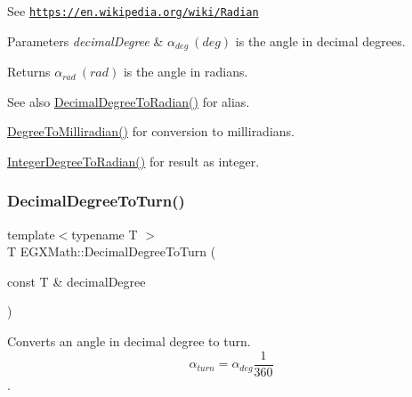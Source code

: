See \href{https://en.wikipedia.org/wiki/Radian}{\tt https\+://en.\+wikipedia.\+org/wiki/\+Radian} 
\begin{DoxyParams}{Parameters}
{\em decimal\+Degree} & $\alpha_{deg}\ (deg)$ is the angle in decimal degrees. \\
\hline
\end{DoxyParams}
\begin{DoxyReturn}{Returns}
$\alpha_{rad}\ (rad)$ is the angle in radians. 
\end{DoxyReturn}
\begin{DoxySeeAlso}{See also}
\mbox{\hyperlink{group___e_g_x_math-_angle_conversions-_decimal_degree_ga906ee2c83cdf4caa59eb613dc2d5d52a}{Decimal\+Degree\+To\+Radian()}} for alias. 

\mbox{\hyperlink{group___e_g_x_math-_angle_conversions-_degree_gae4fa6c2d3805430760783650cfbfdb11}{Degree\+To\+Milliradian()}} for conversion to milliradians. 

\mbox{\hyperlink{group___e_g_x_math-_angle_conversions-_integer_degree_ga05d3368b00ea27b9895de2ffe5c8df38}{Integer\+Degree\+To\+Radian()}} for result as integer. 
\end{DoxySeeAlso}
\mbox{\label{group___e_g_x_math-_angle_conversions-_decimal_degree_ga396a13c10acdef5026c12f3217b142c1}} 
\subsubsection{\texorpdfstring{Decimal\+Degree\+To\+Turn()}{DecimalDegreeToTurn()}}
{\footnotesize\ttfamily template$<$typename T $>$ \\
T E\+G\+X\+Math\+::\+Decimal\+Degree\+To\+Turn (\begin{DoxyParamCaption}\item[{const T \&}]{decimal\+Degree }\end{DoxyParamCaption})}



Converts an angle in decimal degree to turn. \[\alpha_{turn}=\alpha_{deg}\frac{1}{360}\]. 

